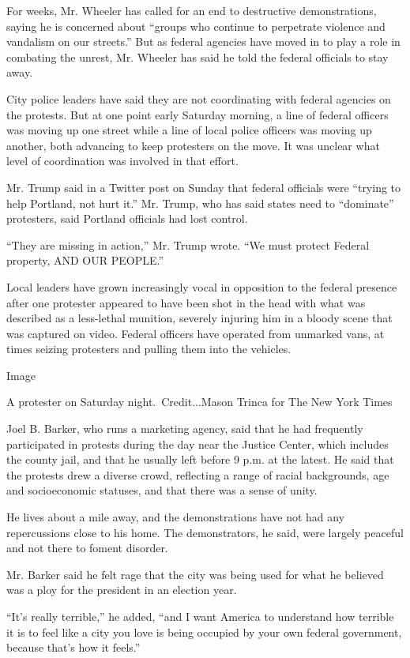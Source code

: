 For weeks, Mr. Wheeler has called for an end to destructive
demonstrations, saying he is concerned about ``groups who continue to
perpetrate violence and vandalism on our streets.'' But as federal
agencies have moved in to play a role in combating the unrest, Mr.
Wheeler has said he told the federal officials to stay away.

City police leaders have said they are not coordinating with federal
agencies on the protests. But at one point early Saturday morning, a
line of federal officers was moving up one street while a line of local
police officers was moving up another, both advancing to keep protesters
on the move. It was unclear what level of coordination was involved in
that effort.

Mr. Trump said in a Twitter post on Sunday that federal officials were
``trying to help Portland, not hurt it.'' Mr. Trump, who has said states
need to ``dominate'' protesters, said Portland officials had lost
control.

``They are missing in action,'' Mr. Trump wrote. ``We must protect
Federal property, AND OUR PEOPLE.''

Local leaders have grown increasingly vocal in opposition to the federal
presence after one protester appeared to have been shot in the head with
what was described as a less-lethal munition, severely injuring him in a
bloody scene that was captured on video. Federal officers have operated
from unmarked vans, at times seizing protesters and pulling them into
the vehicles.

Image

A protester on Saturday night.~Credit...Mason Trinca for The New York
Times

Joel B. Barker, who runs a marketing agency, said that he had frequently
participated in protests during the day near the Justice Center, which
includes the county jail, and that he usually left before 9 p.m. at the
latest. He said that the protests drew a diverse crowd, reflecting a
range of racial backgrounds, age and socioeconomic statuses, and that
there was a sense of unity.

He lives about a mile away, and the demonstrations have not had any
repercussions close to his home. The demonstrators, he said, were
largely peaceful and not there to foment disorder.

Mr. Barker said he felt rage that the city was being used for what he
believed was a ploy for the president in an election year.

``It's really terrible,'' he added, ``and I want America to understand
how terrible it is to feel like a city you love is being occupied by
your own federal government, because that's how it feels.''

